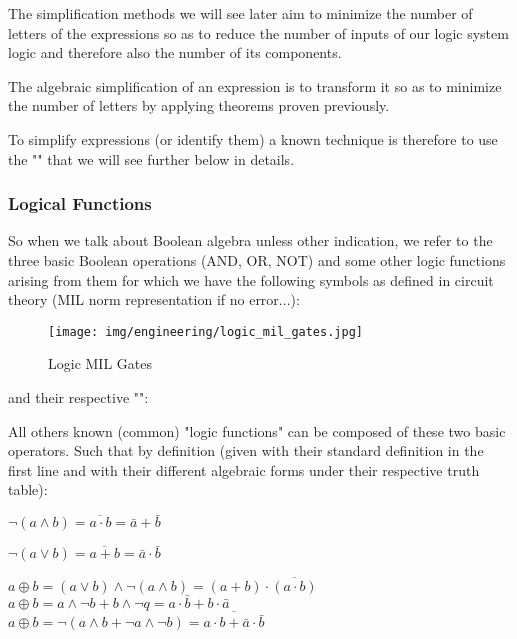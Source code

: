 	The simplification methods we will see later aim to minimize the number of letters of the expressions so as to reduce the number of inputs of our logic system logic and therefore also the number of its components.
	\begin{tcolorbox}[title=Remark,colframe=black,arc=10pt]
	The algebraic simplification of an expression is to transform it so as to minimize the number of letters by applying theorems proven previously.
	\end{tcolorbox}
	To simplify expressions (or identify them) a known technique is therefore to use the "" that we will see further below in details.
	
	\subsubsection{Logical Functions}
	So when we talk about Boolean algebra unless other indication, we refer to the three basic Boolean operations (AND, OR, NOT) and some other logic functions arising from them for which we have the following symbols as defined in circuit theory (MIL norm representation if no error...):
	\begin{figure}[H]
		\centering
		\texttt{[image: img/engineering/logic\_mil\_gates.jpg]}
		\caption{Logic MIL Gates}
	\end{figure}
	and their respective "":
	
	
	
	All others known (common) "logic functions" can be composed of these two basic operators. Such that by definition (given with their standard definition in the first line and with their different algebraic forms under their respective truth table):
	\begin{center}
	$\neg (a \wedge b)=\overline{a\cdot b}=\bar{a}+\bar{b}$
	\end{center}
	
	\begin{center}
		$\neg (a \vee b)=\overline{a + b}=\bar{a}\cdot\bar{b}$
	\end{center}
	
	\begin{center}
		$a\oplus b=(a \vee b)\wedge \neg(a \wedge b)=(a+b)\cdot \overline{(a\cdot b)}$\\
		$a\oplus b=a\wedge \neg b+b\wedge \neg q=a\cdot\bar{b}+b\cdot \bar{a}$\\
		$a\oplus b=\neg(a\wedge b+\neg a\wedge\neg b)=\overline{a\cdot b+\bar{a}\cdot\bar{b}}$
	\end{center}
	
